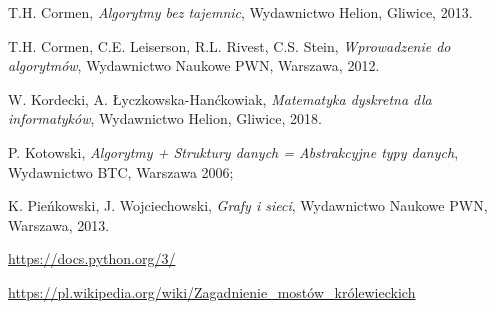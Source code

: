 \documentclass[12pt,a4paper]{book}
\theoremstyle{definition}
\numberwithin{equation}{chapter}
\begin{document}











\def\bibname{Literatura}
\begin{thebibliography}{99}

T.H. Cormen, {\it Algorytmy bez tajemnic}, Wydawnictwo Helion, Gliwice, 2013.

T.H. Cormen, C.E. Leiserson, R.L. Rivest, C.S. Stein, {\it Wprowadzenie do algorytmów}, Wydawnictwo Naukowe PWN, Warszawa, 2012.

W. Kordecki, A. Łyczkowska-Hanćkowiak, {\it Matematyka dyskretna dla informatyków}, Wydawnictwo Helion, Gliwice, 2018.

P. Kotowski, {\it Algorytmy + Struktury danych = Abstrakcyjne typy danych}, Wydawnictwo BTC, Warszawa 2006;

K. Pieńkowski, J. Wojciechowski, {\it Grafy i sieci}, Wydawnictwo Naukowe PWN, Warszawa, 2013.

\url{https://docs.python.org/3/}

\url{https://pl.wikipedia.org/wiki/Zagadnienie\_mostów\_królewieckich}

\end{thebibliography} 
\end{document}
